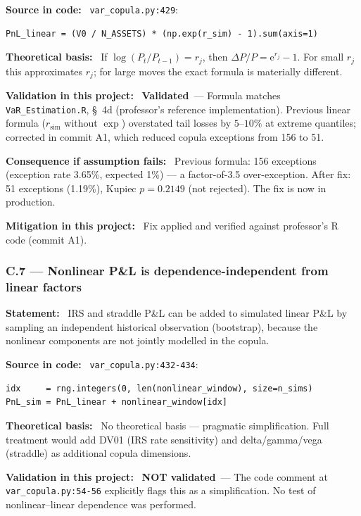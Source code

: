 \documentclass[11pt,a4paper]{article}
\newcommand{\asmfield}[1]{\medskip\noindent\textbf{#1:}\ }
\newcommand{\code}[1]{\texttt{#1}}
\newcommand{\validated}{\textbf{Validated}}
\newcommand{\notvalidated}{\textbf{NOT validated}}
\begin{document}
\asmfield{Source in code}
\code{var\_copula.py:429}:
\begin{lstlisting}
PnL_linear = (V0 / N_ASSETS) * (np.exp(r_sim) - 1).sum(axis=1)
\end{lstlisting}

\asmfield{Theoretical basis}
If $\log(P_t/P_{t-1}) = r_j$, then $\Delta P / P = \mathrm{e}^{r_j} - 1$.
For small $r_j$ this approximates $r_j$; for large moves the exact formula
is materially different.

\asmfield{Validation in this project}
\validated\ --- Formula matches \code{VaR\_Estimation.R}, \S~4d (professor's
reference implementation). Previous linear formula ($r_{\text{sim}}$ without
$\exp$) overstated tail losses by $5$--$10\%$ at extreme quantiles;
corrected in commit A1, which reduced copula exceptions from 156 to 51.

\asmfield{Consequence if assumption fails}
Previous formula: 156 exceptions (exception rate 3.65\%, expected 1\%) ---
a factor-of-3.5 over-exception. After fix: 51 exceptions (1.19\%), Kupiec
$p = 0.2149$ (not rejected). The fix is now in production.

\asmfield{Mitigation in this project}
Fix applied and verified against professor's R code (commit A1).

\subsubsection{C.7 --- Nonlinear P\&L is dependence-independent from linear factors}\label{asm:C7}

\asmfield{Statement}
IRS and straddle P\&L can be added to simulated linear P\&L by sampling
an independent historical observation (bootstrap), because the nonlinear
components are not jointly modelled in the copula.

\asmfield{Source in code}
\code{var\_copula.py:432-434}:
\begin{lstlisting}
idx     = rng.integers(0, len(nonlinear_window), size=n_sims)
PnL_sim = PnL_linear + nonlinear_window[idx]
\end{lstlisting}

\asmfield{Theoretical basis}
No theoretical basis --- pragmatic simplification. Full treatment would
add DV01 (IRS rate sensitivity) and delta/gamma/vega (straddle) as
additional copula dimensions.

\asmfield{Validation in this project}
\notvalidated\ --- The code comment at \code{var\_copula.py:54-56} explicitly
flags this as a simplification. No test of nonlinear--linear dependence
was performed.
\end{document}
